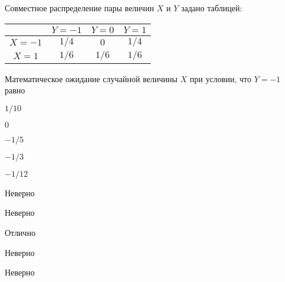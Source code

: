 
\begin{question}
Совместное распределение пары величин \(X\) и \(Y\) задано таблицей:

\begin{tabular}{@{}c|ccc@{}}
\toprule
       & $Y=-1$ & $Y=0$ & $Y=1$ \\ \midrule
$X=-1$ & $1/4$  & $0$   & $1/4$ \\
$X=1$  & $1/6$  & $1/6$ & $1/6$ \\ \bottomrule
\end{tabular}

\vspace{0.5cm}

Математическое ожидание случайной величины \(X\) при условии, что
\(Y=-1\) равно
\begin{answerlist}
  \item \(1/10\)
  \item \(0\)
  \item \(-1/5\)
  \item \(-1/3\)
  \item \(-1/12\)
\end{answerlist}
\end{question}

\begin{solution}
\begin{answerlist}
  \item Неверно
  \item Неверно
  \item Отлично
  \item Неверно
  \item Неверно
\end{answerlist}
\end{solution}

